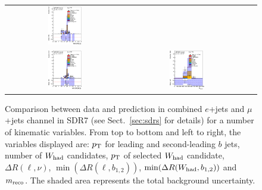 \begin{figure}[htbp]
\begin{center}
\begin{tabular}{ccc}
\includegraphics[width=0.30\textwidth]{appendices/figures/sdrs/VLQAna_WbX_MinDRlb_ELEMUONCR7_1W_NOMINAL.eps} \\
\includegraphics[width=0.30\textwidth]{appendices/figures/sdrs/VLQAna_WbX_MinDRWb_ELEMUONCR7_1W_NOMINAL.eps} &
\includegraphics[width=0.30\textwidth]{appendices/figures/sdrs/VLQAna_WbX_1W_MWb_4_ELEMUONCR7_1W_NOMINAL.eps} & \\
\end{tabular}\caption{\small {Comparison between data and prediction in combined $e$+jets and $\mu$+jets channel in SDR7 (see Sect.~\ref{sec:sdrs} for details) 
for a number of kinematic variables. From top to bottom and left to right, the variables displayed are: $\pt$ for leading and second-leading $b$ jets,
number of $W_{\rm had}$  candidates, $\pt$ of selected $W_{\rm had}$  candidate, $\Delta R(\ell,\nu)$, $\min(\Delta R(\ell, b_{1,2}))$, 
$\min(\Delta R(W_{\rm had}, b_{1,2}))$ and $m_{\rm reco}$.
The shaded area represents the total background uncertainty.}}
\label{fig:ELEMUONCR7_3}
\end{center}
\end{figure}                                                                             
